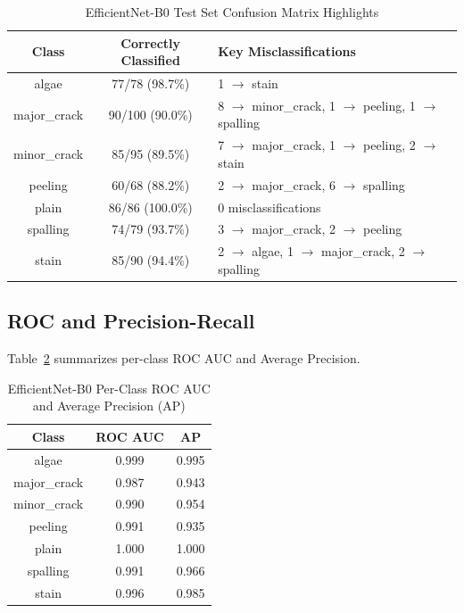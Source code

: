 \documentclass[conference]{IEEEtran}
\begin{document}
\begin{table}[htbp]
\caption{EfficientNet-B0 Test Set Confusion Matrix Highlights}
\label{tab:confusion_matrix}
\centering
\begin{tabular}{c c p{3cm}}
\hline
\textbf{Class} & \textbf{Correctly Classified} & \textbf{Key Misclassifications} \\
\hline
algae        & 77/78 (98.7\%)  & 1 $\rightarrow$ stain \\
major\_crack & 90/100 (90.0\%) & 8 $\rightarrow$ minor\_crack, 1 $\rightarrow$ peeling, 1 $\rightarrow$ spalling \\
minor\_crack & 85/95 (89.5\%)  & 7 $\rightarrow$ major\_crack, 1 $\rightarrow$ peeling, 2 $\rightarrow$ stain \\
peeling      & 60/68 (88.2\%)  & 2 $\rightarrow$ major\_crack, 6 $\rightarrow$ spalling \\
plain        & 86/86 (100.0\%) & 0 misclassifications \\
spalling     & 74/79 (93.7\%)  & 3 $\rightarrow$ major\_crack, 2 $\rightarrow$ peeling \\
stain        & 85/90 (94.4\%)  & 2 $\rightarrow$ algae, 1 $\rightarrow$ major\_crack, 2 $\rightarrow$ spalling \\
\hline
\end{tabular}
\end{table}

\subsection{ROC and Precision-Recall}
Table~\ref{tab:roc_ap} summarizes per-class ROC AUC and Average Precision.

\begin{table}[htbp]
\caption{EfficientNet-B0 Per-Class ROC AUC and Average Precision (AP)}
\begin{center}
\begin{tabular}{|c|c|c|}
\hline
\textbf{Class} & \textbf{ROC AUC} & \textbf{AP} \\
\hline
algae        & 0.999 & 0.995 \\
major\_crack & 0.987 & 0.943 \\
minor\_crack & 0.990 & 0.954 \\
peeling      & 0.991 & 0.935 \\
plain        & 1.000 & 1.000 \\
spalling     & 0.991 & 0.966 \\
stain        & 0.996 & 0.985 \\
\hline
\end{tabular}
\label{tab:roc_ap}
\end{center}
\end{table}
\end{document}
